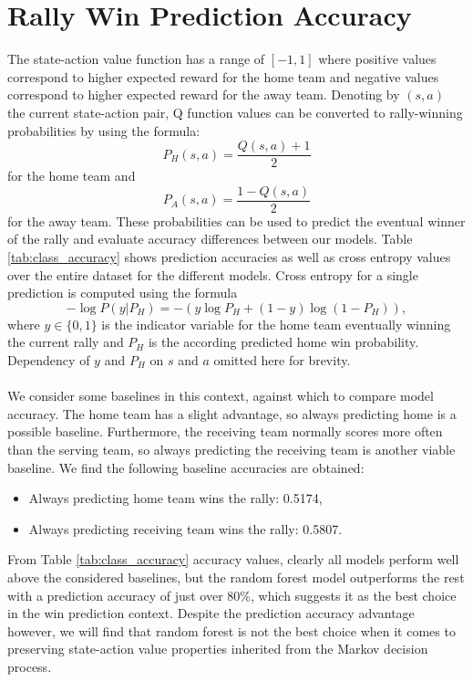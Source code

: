 \documentclass{sfuthesis}
\begin{document}
	\section{Rally Win Prediction Accuracy}
	The state-action value function has a range of $[-1,1]$ where positive values correspond to higher expected reward for the home team and negative values correspond to higher expected reward for the away team. Denoting by $(s,a)$ the current state-action pair, Q function values can be converted to rally-winning probabilities by using the formula:
	\begin{equation}
		P_H(s,a) = \frac{Q(s,a)+1}{2}
		\label{eq:q_to_prob}
	\end{equation}
	for the home team and
	\begin{equation}
		P_A(s,a) = \frac{1-Q(s,a)}{2}
	\end{equation}
	for the away team. These probabilities can be used to predict the eventual winner of the rally and evaluate accuracy differences between our models. Table \ref{tab:class_accuracy} shows prediction accuracies as well as cross entropy values over the entire dataset for the different models. Cross entropy for a single prediction is computed using the formula
	\begin{equation}
		-\log P(y|P_H) = - (y \log P_H + (1-y) \log(1-P_H)),
	\end{equation}
	where $y \in \{0,1\}$ is the indicator variable for the home team eventually winning the current rally and $P_H$ is the according predicted home win probability. Dependency of $y$ and $P_H$ on $s$ and $a$ omitted here for brevity.\\\\
	We consider some baselines in this context, against which to compare model accuracy. The home team has a slight advantage, so always predicting home is a possible baseline. Furthermore, the receiving team normally scores more often than the serving team, so always predicting the receiving team is another viable baseline. We find the following baseline accuracies are obtained:
	\begin{itemize}
		\item Always predicting home team wins the rally: 0.5174,
		\item Always predicting receiving team wins the rally: 0.5807.
	\end{itemize}
	From Table \ref{tab:class_accuracy} accuracy values, clearly all models perform well above the considered baselines, but the random forest model outperforms the rest with a prediction accuracy of just over 80\%, which suggests it as the best choice in the win prediction context. Despite the prediction accuracy advantage however, we will find that random forest is not the best choice when it comes to preserving state-action value properties inherited from the Markov decision process.\\
\end{document}
